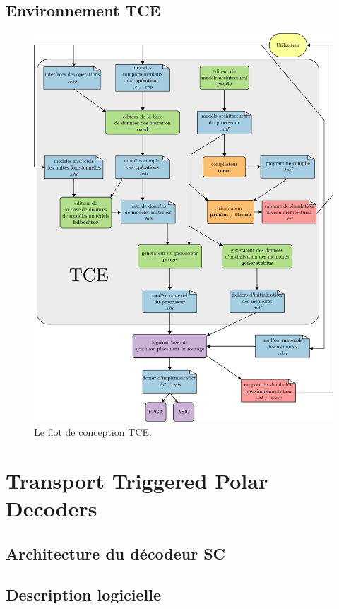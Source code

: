 \subsection{Environnement TCE}
\begin{figure}[htp]
\centering
\includegraphics[width=\textwidth]{main/ch4_fig/tce}
\caption{Le flot de conception TCE.}
\end{figure}

\section{Transport Triggered Polar Decoders}

\subsection{Architecture du décodeur SC}
\subsection{Description logicielle}
